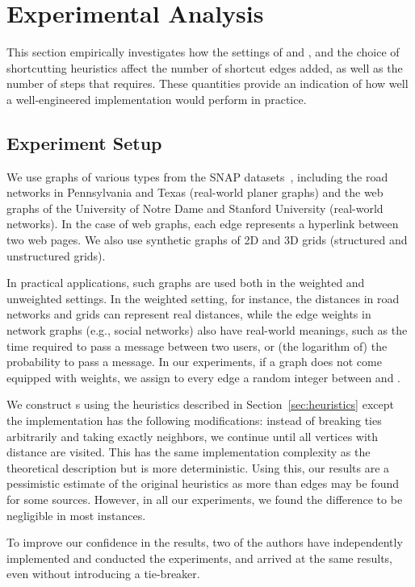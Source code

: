 \section{Experimental Analysis}
\label{sec:exp}

This section empirically investigates how the settings of  and , and
the choice of shortcutting heuristics affect the number of shortcut edges added,
as well as the number of steps that \AlgName{} requires.  These
quantities provide an indication of how well a well-engineered implementation
would perform in practice.






\subsection{Experiment Setup}
We use graphs of various types from the SNAP datasets~\cite{leskovec2014snap},
including the road networks in Pennsylvania and Texas (real-world planer graphs)
and the web graphs of the University of Notre Dame and Stanford University
(real-world networks).  In the case of web graphs, each edge represents a
hyperlink between two web pages.  We also use synthetic graphs of 2D and 3D
grids (structured and unstructured grids).

In practical applications, such graphs are used both in the weighted and
unweighted settings.  In the weighted setting, for instance, the distances in
road networks and grids can represent real distances, while the edge weights in
network graphs (e.g., social networks) also have real-world meanings, such as
the time required to pass a message between two users, or (the logarithm of) the
probability to pass a message.  In our experiments, if a graph does not come
equipped with weights, we assign to every edge a random integer between  and
.

We construct s using the heuristics described in
Section~\ref{sec:heuristics} except the implementation has the following
modifications: instead of breaking ties arbitrarily and taking exactly 
neighbors, we continue until all vertices with distance  are
visited.  This has the same implementation complexity as the theoretical
description but is more deterministic.  Using this, our results are a
pessimistic estimate of the original heuristics as more than  edges may be
found for some sources.  However, in all our experiments, we found the
difference to be negligible in most instances.

To improve our confidence in the results, two of the authors have independently
implemented and conducted the experiments, and arrived at the same results, even
without introducing a tie-breaker.






